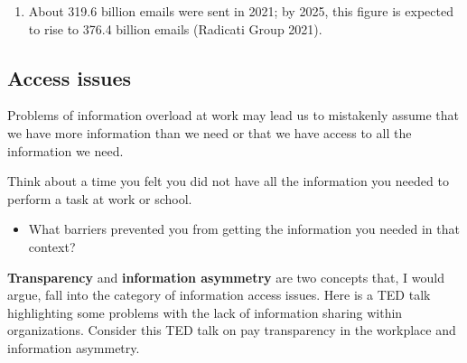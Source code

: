 \documentclass[
  letterpaper,
  DIV=11,
  numbers=noendperiod]{scrreprt}
\providecommand{\tightlist}{%
  \setlength{\itemsep}{0pt}\setlength{\parskip}{0pt}}
\begin{document}
\begin{tcolorbox}[enhanced jigsaw, arc=.35mm, bottomrule=.15mm, bottomtitle=1mm, breakable, colback=white, colbacktitle=quarto-callout-note-color!10!white, colframe=quarto-callout-note-color-frame, coltitle=black, left=2mm, leftrule=.75mm, opacityback=0, opacitybacktitle=0.6, rightrule=.15mm, title=\textcolor{quarto-callout-note-color}{\faInfo}\hspace{0.5em}{Did you know?}, titlerule=0mm, toprule=.15mm, toptitle=1mm]

\begin{enumerate}
\def\labelenumi{\arabic{enumi}.}
\tightlist
\item
  About 319.6 billion emails were sent in 2021; by 2025, this figure is
  expected to rise to 376.4 billion emails (Radicati Group 2021).
\end{enumerate}

\end{tcolorbox}

\subsection{Access issues}\label{access-issues-1}

Problems of information overload at work may lead us to mistakenly
assume that we have more information than we need or that we have access
to all the information we need.

\begin{tcolorbox}[enhanced jigsaw, arc=.35mm, bottomrule=.15mm, bottomtitle=1mm, breakable, colback=white, colbacktitle=quarto-callout-tip-color!10!white, colframe=quarto-callout-tip-color-frame, coltitle=black, left=2mm, leftrule=.75mm, opacityback=0, opacitybacktitle=0.6, rightrule=.15mm, title=\textcolor{quarto-callout-tip-color}{\faLightbulb}\hspace{0.5em}{Pause and reflect}, titlerule=0mm, toprule=.15mm, toptitle=1mm]

Think about a time you felt you did not have all the information you
needed to perform a task at work or school.

\begin{itemize}
\tightlist
\item
  What barriers prevented you from getting the information you needed in
  that context?
\end{itemize}

\end{tcolorbox}

\textbf{Transparency} and \textbf{information asymmetry} are two
concepts that, I would argue, fall into the category of information
access issues. Here is a TED talk highlighting some problems with the
lack of information sharing within organizations. Consider this TED talk
on pay transparency in the workplace and information asymmetry.
\end{document}
